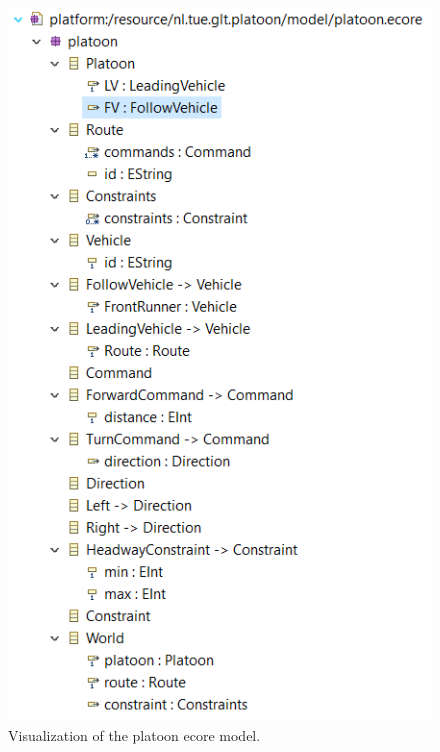 \documentclass[a4paper,twoside,11pt]{article}
\begin{document}
\begin{figure}[h]
\includegraphics{platoon.PNG}
\caption{Visualization of the platoon ecore model.}
\label{platoon-ecore}
\end{figure}
\end{document}
